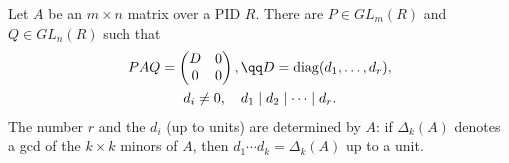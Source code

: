 \begin{theorem}\label{thm:smith}
Let $A$ be an $m\times n$ matrix over a PID $R$. There are $P\in GL_m(R)$ and $Q\in GL_n(R)$ such that
\[
\begin{gathered}PAQ=\begin{pmatrix}D&0\\0&0\end{pmatrix},\qq D=\operatorname{diag}(d_1,\dots,d_r),\\ d_i\ne0,\quad d_1\mid d_2\mid\dots\mid d_r.\end{gathered}
\]
The number $r$ and the $d_i$ (up to units) are determined by $A$: if $\Delta_k(A)$ denotes a gcd of the $k\times k$ minors of $A$, then $d_1\cdots d_k=\Delta_k(A)$ up to a unit.
\end{theorem}

